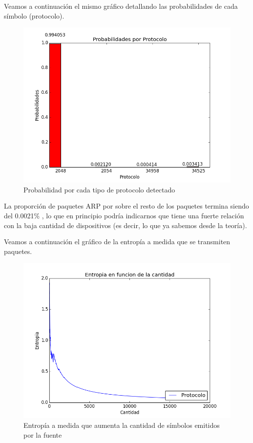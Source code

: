\newpage

Veamos a continuaci\'on el mismo gr\'afico detallando las probabilidades de cada s\'imbolo (protocolo).

\begin{figure}[h!]
\centering
\includegraphics[width=0.7\linewidth]{imagenes/exp1/2probabilidadProtocolo}
\caption{Probabilidad por cada tipo de protocolo detectado}
\label{exp1grafico1}
\end{figure}

La proporci\'on de paquetes ARP por sobre el resto de los paquetes termina siendo del 0.0021\% , lo que en principio podr\'ia indicarnos que tiene una fuerte relaci\'on con la baja cantidad de dispositivos (es decir, lo que ya sabemos desde la teor\'ia).\newline

Veamos a continuaci\'on el gr\'afico de la entrop\'ia a medida que se transmiten paquetes.


\begin{figure}[h!]
\centering
\includegraphics[width=0.7\linewidth]{imagenes/exp1/3entropiaProtocolo}
\caption{Entrop\'ia a medida que aumenta la cantidad de s\'imbolos emitidos por la fuente}
\label{exp1grafico1}
\end{figure}


